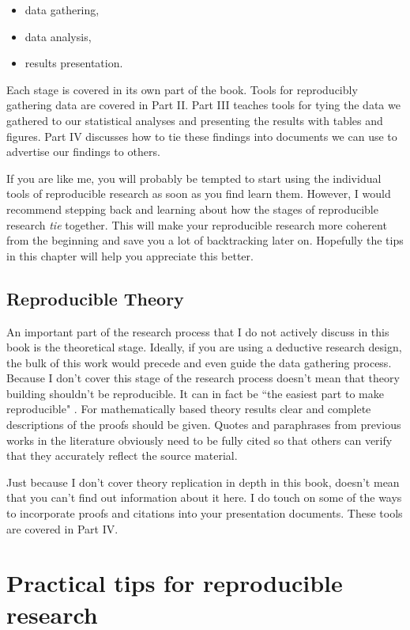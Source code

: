 \begin{itemize}
    \item data gathering,
    \item data analysis,
    \item results presentation.
\end{itemize}

Each stage is covered in its own part of the book. Tools for reproducibly gathering data are covered in Part II. Part III teaches tools for tying the data we gathered to our statistical analyses and presenting the results with tables and figures. Part IV discusses how to tie these findings into documents we can use to advertise our findings to others.

If you are like me, you will probably be tempted to start using the individual tools of reproducible research as soon as you find learn them. However, I would recommend stepping back and learning about how the stages of reproducible research {\emph{tie}} together. This will make your reproducible research more coherent from the beginning and save you a lot of backtracking later on. Hopefully the tips in this chapter will help you appreciate this better.

\subsection{Reproducible Theory}

An important part of the research process that I do not actively discuss in this book is the theoretical stage. Ideally, if you are using a deductive research design, the bulk of this work would precede and even guide the data gathering process. Because I don't cover this stage of the research process doesn't mean that theory building shouldn't be reproducible. It can in fact be ``the easiest part to make reproducible" \cite[1254]{Vandewalle2007}. For mathematically based theory results clear and complete descriptions of the proofs should be given. Quotes and paraphrases from previous works in the literature obviously need to be fully cited so that others can verify that they accurately reflect the source material.

Just because I don't cover theory replication in depth in this book, doesn't mean that you can't find out information about it here. I do touch on some of the ways to incorporate proofs and citations into your presentation documents. These tools are covered in Part IV.

\section{Practical tips for reproducible research}

